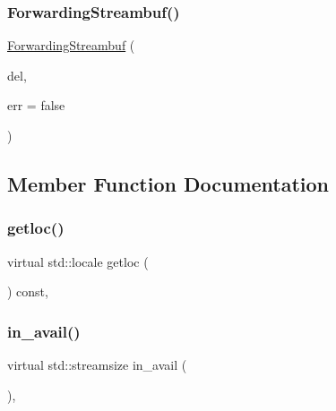 \subsubsection{\texorpdfstring{Forwarding\+Streambuf()}{ForwardingStreambuf()}}
{\footnotesize\ttfamily \mbox{\hyperlink{classstanfordcpplib_1_1ForwardingStreambuf}{Forwarding\+Streambuf}} (\begin{DoxyParamCaption}\item[{\mbox{\hyperlink{classstanfordcpplib_1_1ConsoleStreambuf}{Console\+Streambuf}} \&}]{del,  }\item[{bool}]{err = {\ttfamily false} }\end{DoxyParamCaption})\hspace{0.3cm}{\ttfamily [inline]}}



\subsection{Member Function Documentation}
\mbox{\label{classstanfordcpplib_1_1ForwardingStreambuf_aaea5d5971e30e03408abc9b4b9cdd332}} 
\subsubsection{\texorpdfstring{getloc()}{getloc()}}
{\footnotesize\ttfamily virtual std\+::locale getloc (\begin{DoxyParamCaption}{ }\end{DoxyParamCaption}) const\hspace{0.3cm}{\ttfamily [inline]}, {\ttfamily [virtual]}}

\mbox{\label{classstanfordcpplib_1_1ForwardingStreambuf_a7c3ad202fdca7b02e80cce27e4fe009e}} 
\subsubsection{\texorpdfstring{in\+\_\+avail()}{in\_avail()}}
{\footnotesize\ttfamily virtual std\+::streamsize in\+\_\+avail (\begin{DoxyParamCaption}{ }\end{DoxyParamCaption})\hspace{0.3cm}{\ttfamily [inline]}, {\ttfamily [virtual]}}


